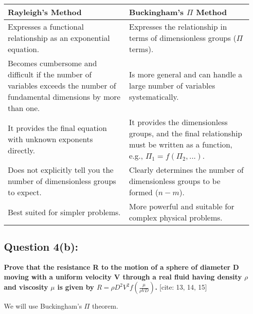 \documentclass{article}
\begin{document}
\begin{center}
\begin{tabular}{|p{}|p{}|}
\hline
\textbf{Rayleigh's Method} & \textbf{Buckingham's $\Pi$ Method} \\
\hline
Expresses a functional relationship as an exponential equation. & Expresses the relationship in terms of dimensionless groups ($\Pi$ terms). \\
\hline
Becomes cumbersome and difficult if the number of variables exceeds the number of fundamental dimensions by more than one. & Is more general and can handle a large number of variables systematically. \\
\hline
It provides the final equation with unknown exponents directly. & It provides the dimensionless groups, and the final relationship must be written as a function, e.g., $\Pi_1 = f(\Pi_2, \dots)$. \\
\hline
Does not explicitly tell you the number of dimensionless groups to expect. & Clearly determines the number of dimensionless groups to be formed ($n-m$). \\
\hline
Best suited for simpler problems. & More powerful and suitable for complex physical problems. \\
\hline
\end{tabular}
\end{center}
\hrulefill

\subsection*{\textbf{Question 4(b):}}
\textbf{Prove that the resistance R to the motion of a sphere of diameter D moving with a uniform velocity V through a real fluid having density $\rho$ and viscosity $\mu$ is given by $R=\rho D^{2}V^{2}f\left(\frac{\mu}{\rho VD}\right)$.} [cite: 13, 14, 15]

We will use Buckingham's $\Pi$ theorem.
\end{document}
